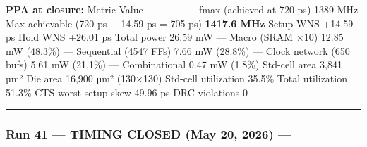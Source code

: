 \begin{record}
\textbf{PPA at closure:} \textbar{} Metric \textbar{} Value \textbar{}
\textbar-\/-\/-\/-\/-\/-\/-\/-\textbar-\/-\/-\/-\/-\/-\/-\textbar{}
\textbar{} fmax (achieved at 720 ps) \textbar{} 1389 MHz \textbar{}
\textbar{} Max achievable (720 ps − 14.59 ps = 705 ps) \textbar{}
\textbf{1417.6 MHz} \textbar{} \textbar{} Setup WNS \textbar{} +14.59 ps
\textbar{} \textbar{} Hold WNS \textbar{} +26.01 ps \textbar{}
\textbar{} Total power \textbar{} 26.59 mW \textbar{} \textbar{} ---
Macro (SRAM ×10) \textbar{} 12.85 mW (48.3\%) \textbar{} \textbar{} ---
Sequential (4547 FFs) \textbar{} 7.66 mW (28.8\%) \textbar{} \textbar{}
--- Clock network (650 bufs) \textbar{} 5.61 mW (21.1\%) \textbar{}
\textbar{} --- Combinational \textbar{} 0.47 mW (1.8\%) \textbar{}
\textbar{} Std-cell area \textbar{} 3,841 µm² \textbar{} \textbar{} Die
area \textbar{} 16,900 µm² (130×130) \textbar{} \textbar{} Std-cell
utilization \textbar{} 35.5\% \textbar{} \textbar{} Total utilization
\textbar{} 51.3\% \textbar{} \textbar{} CTS worst setup skew \textbar{}
49.96 ps \textbar{} \textbar{} DRC violations \textbar{} 0 \textbar{}

\begin{center}\rule{0.5\linewidth}{0.5pt}\end{center}

\end{record}

\subsubsection{\texorpdfstring{Run 41 --- TIMING CLOSED \ok{} (May 20,
2026) ---
}{Run 41 --- TIMING CLOSED  (May 20, 2026) --- }}\label{cr:run:asap7-cpu:run-41-timing-closed-white-check-mark-may-20-2026-run-2026-05-20-05-17-59}

